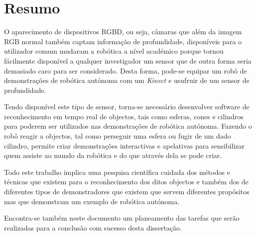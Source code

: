 \chapter{Resumo}

O aparecimento de dispositivos RGBD, ou seja, câmaras que além da imagem RGB
normal também captam informação de profundidade, disponíveis para o utilizador
comum mudaram a robótica a nível académico porque tornou fácilmente disponível
a qualquer investigador um sensor que de outra forma seria demasiado caro
para ser considerado. Desta forma, pode-se equipar um robô de demonstrações de
robótica autónoma com um \emph{Kinect} e usufruir de um sensor de profundidade.

Tendo disponível este tipo de sensor, torna-se necessário desenvolver 
software de reconhecimento em tempo real de objectos, tais como esferas, cones
e cilindros para poderem ser utilizados nas demonstrações de robótica
autónoma. Fazendo o robô reagir a objectos, tal como perseguir uma esfera ou
fugir de um dado cilindro, permite criar demonstrações interactivas e apelativas
para sensibilizar quem assiste ao mundo da robótica e do que através dela se pode
criar.

Todo este trabalho implica uma pesquisa científica cuidada dos métodos e técnicas
que existem para o reconhecimento dos ditos objectos e também dos de diferentes tipos
de demonstradores que existem que servem diferentes propósitos mas que demonstram
um exemplo de robótica autónoma.

Encontra-se também neste documento um planeamento das tarefas que serão realizadas
para a conclusão com sucesso desta dissertação.

